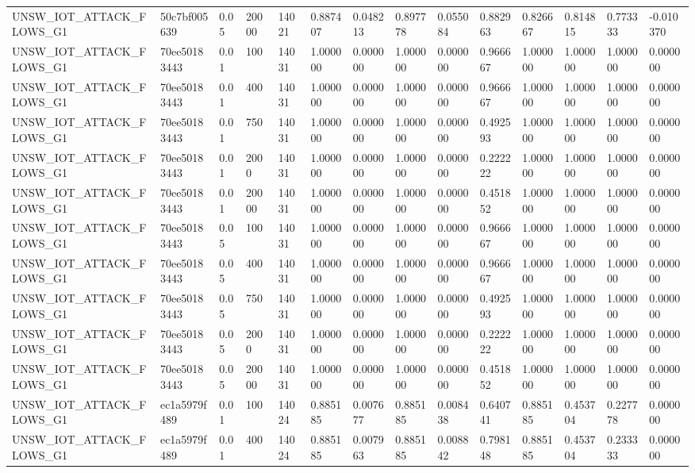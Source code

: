 \begin{tabular}{llllllllllllll}
UNSW\_IOT\_ATTACK\_FLOWS\_G1 & 50c7bf005639 & 0.05 & 20000 & 14021 & 0.887407 & 0.048213 & 0.897778 & 0.055084 & 0.882963 & 0.826667 & 0.814815 & 0.773333 & -0.010370 \\
UNSW\_IOT\_ATTACK\_FLOWS\_G1 & 70ee50183443 & 0.01 & 100 & 14031 & 1.000000 & 0.000000 & 1.000000 & 0.000000 & 0.966667 & 1.000000 & 1.000000 & 1.000000 & 0.000000 \\
UNSW\_IOT\_ATTACK\_FLOWS\_G1 & 70ee50183443 & 0.01 & 400 & 14031 & 1.000000 & 0.000000 & 1.000000 & 0.000000 & 0.966667 & 1.000000 & 1.000000 & 1.000000 & 0.000000 \\
UNSW\_IOT\_ATTACK\_FLOWS\_G1 & 70ee50183443 & 0.01 & 750 & 14031 & 1.000000 & 0.000000 & 1.000000 & 0.000000 & 0.492593 & 1.000000 & 1.000000 & 1.000000 & 0.000000 \\
UNSW\_IOT\_ATTACK\_FLOWS\_G1 & 70ee50183443 & 0.01 & 2000 & 14031 & 1.000000 & 0.000000 & 1.000000 & 0.000000 & 0.222222 & 1.000000 & 1.000000 & 1.000000 & 0.000000 \\
UNSW\_IOT\_ATTACK\_FLOWS\_G1 & 70ee50183443 & 0.01 & 20000 & 14031 & 1.000000 & 0.000000 & 1.000000 & 0.000000 & 0.451852 & 1.000000 & 1.000000 & 1.000000 & 0.000000 \\
UNSW\_IOT\_ATTACK\_FLOWS\_G1 & 70ee50183443 & 0.05 & 100 & 14031 & 1.000000 & 0.000000 & 1.000000 & 0.000000 & 0.966667 & 1.000000 & 1.000000 & 1.000000 & 0.000000 \\
UNSW\_IOT\_ATTACK\_FLOWS\_G1 & 70ee50183443 & 0.05 & 400 & 14031 & 1.000000 & 0.000000 & 1.000000 & 0.000000 & 0.966667 & 1.000000 & 1.000000 & 1.000000 & 0.000000 \\
UNSW\_IOT\_ATTACK\_FLOWS\_G1 & 70ee50183443 & 0.05 & 750 & 14031 & 1.000000 & 0.000000 & 1.000000 & 0.000000 & 0.492593 & 1.000000 & 1.000000 & 1.000000 & 0.000000 \\
UNSW\_IOT\_ATTACK\_FLOWS\_G1 & 70ee50183443 & 0.05 & 2000 & 14031 & 1.000000 & 0.000000 & 1.000000 & 0.000000 & 0.222222 & 1.000000 & 1.000000 & 1.000000 & 0.000000 \\
UNSW\_IOT\_ATTACK\_FLOWS\_G1 & 70ee50183443 & 0.05 & 20000 & 14031 & 1.000000 & 0.000000 & 1.000000 & 0.000000 & 0.451852 & 1.000000 & 1.000000 & 1.000000 & 0.000000 \\
UNSW\_IOT\_ATTACK\_FLOWS\_G1 & ec1a5979f489 & 0.01 & 100 & 14024 & 0.885185 & 0.007677 & 0.885185 & 0.008438 & 0.640741 & 0.885185 & 0.453704 & 0.227778 & 0.000000 \\
UNSW\_IOT\_ATTACK\_FLOWS\_G1 & ec1a5979f489 & 0.01 & 400 & 14024 & 0.885185 & 0.007963 & 0.885185 & 0.008842 & 0.798148 & 0.885185 & 0.453704 & 0.233333 & 0.000000 \\

\end{tabular}
